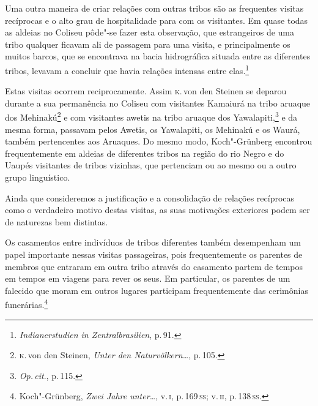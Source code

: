 Uma outra maneira de criar relações com outras tribos são as frequentes
visitas recíprocas e o alto grau de hospitalidade para com os
visitantes. Em quase todas as aldeias no Coliseu pôde"-se fazer esta
observação, que estrangeiros de uma tribo qualquer ficavam ali de
passagem para uma visita, e principalmente os muitos barcos, que se
encontrava na bacia hidrográfica situada entre as diferentes tribos,
levavam a concluir que havia relações intensas entre elas.\footnote{\textit{Indianerstudien
  in Zentralbrasilien}, p.\,91.}

Estas visitas ocorrem reciprocamente. Assim \textsc{k}.\,von den Steinen se
deparou durante a sua permanência no Coliseu com visitantes Kamaiurá na
tribo aruaque dos Mehinakú\footnote{\textsc{k}.\,von den Steinen, \textit{Unter den Naturvölkern\ldots}, p.\,105.} e com visitantes awetis na
tribo aruaque dos Yawalapiti,\footnote{\textit{Op.\,cit}., p.\,115.} e da mesma
forma, passavam pelos Awetis, os Yawalapiti, os Mehinakú e os Waurá,
também pertencentes aos Aruaques. Do mesmo modo, Koch"-Grünberg encontrou
frequentemente em aldeias de diferentes tribos na região do rio Negro e
do Uaupés visitantes de tribos vizinhas, que pertenciam ou ao mesmo ou a
outro grupo linguístico.

Ainda que consideremos a justificação e a consolidação de relações
recíprocas como o verdadeiro motivo destas visitas, as suas motivações
exteriores podem ser de naturezas bem distintas.

{Os casamentos entre indivíduos de tribos diferentes também desempenham
um papel importante nessas visitas passageiras, pois frequentemente os
parentes de membros que entraram em outra tribo através do casamento
partem de tempos em tempos em viagens para rever os seus. Em particular,
os parentes de um falecido que moram em outros lugares participam
frequentemente das cerimônias funerárias.\footnote{Koch"-Grünberg,
  \textit{Zwei Jahre unter\ldots}, v.\,\textsc{i}, p.\,169\,\textsc{ss}; v.\,\textsc{ii}, p.\,138\,\textsc{ss}.}}

